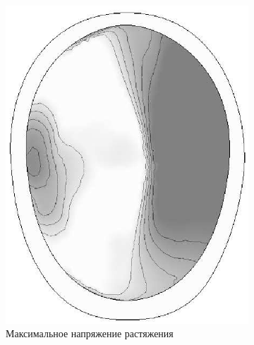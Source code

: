 \begin{figure}[h]
\begin{subfigure}[b]{0.3\textwidth}
\includegraphics[width=\textwidth]{png/cranium/2d-problem-res-2.png}
\caption{Максимальное напряжение растяжения}
\end{subfigure}
\begin{subfigure}[b]{0.3\textwidth}
\centering

\end{subfigure}
\end{figure}
